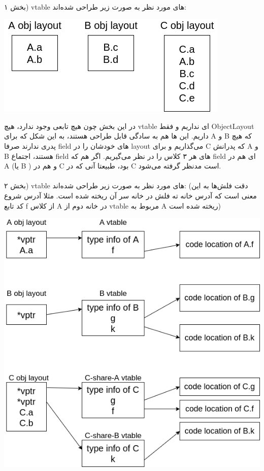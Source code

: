 \\
بخش ۱) vtable های مورد نظر به صورت زیر طراحی شده‌اند:
\graphicspath{{./images/}}
\begin{center}
	\includegraphics[scale=0.7]{q2_1.png}
\end{center}
در این بخش چون هیچ تابعی وجود ندارد، هیچ vtable ای نداریم و فقط ObjectLayout داریم. این ‌ها هم به سادگی قابل طراحی هستند، به این شکل که برای A و B که هیچ پدری ندارند صرفا field های خودشان را در layout می‌گذاریم و برای C که پدرانش A و B هستند، اجتماع field های هر ۳ کلاس را در نظر می‌گیریم. اگر هم که field ای هم در A (یا B ) و هم در C بود، طبیعتا آنی که در C است مدنظر گرفته می‌شود.
\\
\\
بخش ۲) vtable های مورد نظر به صورت زیر طراحی شده‌اند: (دقت فلش‌ها به این معنی است که آدرس خانه ته فلش در خانه سر آن ریخته شده است. مثلا آدرس شروع کد تابع f از کلاس A در خانه دوم از vtable مربوط به A ریخته شده است)
\begin{center}
	\includegraphics[scale=0.7]{q2_2.png}
\end{center}
